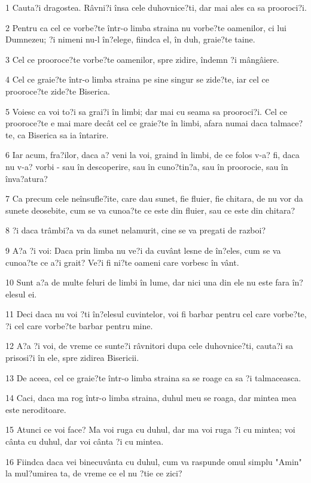 \par 1 Cauta?i dragostea. Râvni?i însa cele duhovnice?ti, dar mai ales ca sa prooroci?i.
\par 2 Pentru ca cel ce vorbe?te într-o limba straina nu vorbe?te oamenilor, ci lui Dumnezeu; ?i nimeni nu-l în?elege, fiindca el, în duh, graie?te taine.
\par 3 Cel ce prooroce?te vorbe?te oamenilor, spre zidire, îndemn ?i mângâiere.
\par 4 Cel ce graie?te într-o limba straina pe sine singur se zide?te, iar cel ce prooroce?te zide?te Biserica.
\par 5 Voiesc ca voi to?i sa grai?i în limbi; dar mai cu seama sa prooroci?i. Cel ce prooroce?te e mai mare decât cel ce graie?te în limbi, afara numai daca talmace?te, ca Biserica sa ia întarire.
\par 6 Iar acum, fra?ilor, daca a? veni la voi, graind în limbi, de ce folos v-a? fi, daca nu v-a? vorbi - sau în descoperire, sau în cuno?tin?a, sau în proorocie, sau în înva?atura?
\par 7 Ca precum cele neînsufle?ite, care dau sunet, fie fluier, fie chitara, de nu vor da sunete deosebite, cum se va cunoa?te ce este din fluier, sau ce este din chitara?
\par 8 ?i daca trâmbi?a va da sunet nelamurit, cine se va pregati de razboi?
\par 9 A?a ?i voi: Daca prin limba nu ve?i da cuvânt lesne de în?eles, cum se va cunoa?te ce a?i grait? Ve?i fi ni?te oameni care vorbesc în vânt.
\par 10 Sunt a?a de multe feluri de limbi în lume, dar nici una din ele nu este fara în?elesul ei.
\par 11 Deci daca nu voi ?ti în?elesul cuvintelor, voi fi barbar pentru cel care vorbe?te, ?i cel care vorbe?te barbar pentru mine.
\par 12 A?a ?i voi, de vreme ce sunte?i râvnitori dupa cele duhovnice?ti, cauta?i sa prisosi?i în ele, spre zidirea Bisericii.
\par 13 De aceea, cel ce graie?te într-o limba straina sa se roage ca sa ?i talmaceasca.
\par 14 Caci, daca ma rog într-o limba straina, duhul meu se roaga, dar mintea mea este neroditoare.
\par 15 Atunci ce voi face? Ma voi ruga cu duhul, dar ma voi ruga ?i cu mintea; voi cânta cu duhul, dar voi cânta ?i cu mintea.
\par 16 Fiindca daca vei binecuvânta cu duhul, cum va raspunde omul simplu "Amin" la mul?umirea ta, de vreme ce el nu ?tie ce zici?
